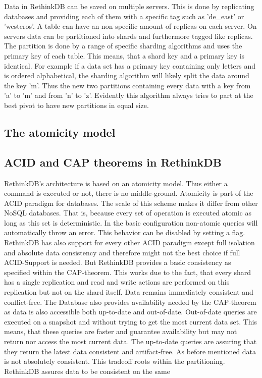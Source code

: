 Data in RethinkDB can be saved on multiple servers. This is done by replicating databases and providing each of them with a specific tag such as 'de\_east' or 'westeros'. A table can have an non-specific amount of replicas on each server. 
On servers data can be partitioned into shards and furthermore tagged like replicas.  The partition is done by a range of specific sharding algorithms and uses the primary key of each table. This means, that a shard key and a primary key is identical. For example if a data set has a primary key containing only letters and is ordered alphabetical, the sharding algorithm will likely split the data around the key 'm'. Thus the new two partitions containing every data with a key from 'a' to 'm' and from 'n' to 'z'. Evidently this algorithm always tries to part at the best pivot to have new partitions in equal size.

\subsection{The atomicity model}



\subsection{ACID and CAP theorems in RethinkDB}

RethinkDB’s architecture is based on an atomicity model. Thus either a command is executed or not, there is no middle-ground. Atomicity is part of the ACID paradigm for databases. The scale of this scheme makes it differ from other NoSQL databases. That is, because every set of operation is executed atomic as long as this set is deterministic. In the basic configuration non-atomic queries will automatically throw an error. This behavior can be disabled by setting a flag. 
RethinkDB has also support for every other ACID paradigm except full isolation and absolute data consistency and therefore might not the best choice if full ACID-Support is needed. But RethinkDB provides a basic consistency as specified within the CAP-theorem. This works due to the fact, that every shard has a single replication and read and write actions are performed on this replication but not on the shard itself. Data remains immediately consistent and conflict-free. 
The Database also provides availability needed by the CAP-theorem as data is also accessible both up-to-date and out-of-date. Out-of-date queries are executed on a snapshot and without trying to get the most current data set. This means, that these queries are faster and guarantee availability but may not return nor access the most current data. The up-to-date queries are assuring that they return the latest data consistent and artifact-free. As before mentioned data is not absolutely consistent. This tradeoff roots within the partitioning. RethinkDB assures data to be consistent on the same 

